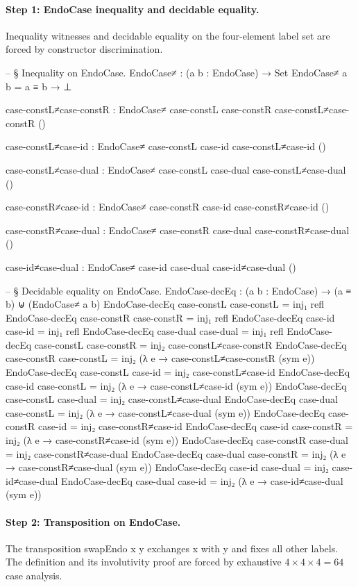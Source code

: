 \documentclass[11pt,a4paper]{book}
\def\texttt#1{#1}%
\begin{document}
\paragraph{Step 1: EndoCase inequality and decidable equality.}
Inequality witnesses and decidable equality on the four-element label set are forced by constructor discrimination.

\begin{code}
-- § Inequality on EndoCase.
EndoCase≠ : (a b : EndoCase) → Set
EndoCase≠ a b = a ≡ b → ⊥

case-constL≠case-constR : EndoCase≠ case-constL case-constR
case-constL≠case-constR ()

case-constL≠case-id : EndoCase≠ case-constL case-id
case-constL≠case-id ()

case-constL≠case-dual : EndoCase≠ case-constL case-dual
case-constL≠case-dual ()

case-constR≠case-id : EndoCase≠ case-constR case-id
case-constR≠case-id ()

case-constR≠case-dual : EndoCase≠ case-constR case-dual
case-constR≠case-dual ()

case-id≠case-dual : EndoCase≠ case-id case-dual
case-id≠case-dual ()

-- § Decidable equality on EndoCase.
EndoCase-decEq : (a b : EndoCase) → (a ≡ b) ⊎ (EndoCase≠ a b)
EndoCase-decEq case-constL case-constL = inj₁ refl
EndoCase-decEq case-constR case-constR = inj₁ refl
EndoCase-decEq case-id     case-id     = inj₁ refl
EndoCase-decEq case-dual   case-dual   = inj₁ refl
EndoCase-decEq case-constL case-constR = inj₂ case-constL≠case-constR
EndoCase-decEq case-constR case-constL = inj₂ (λ e → case-constL≠case-constR (sym e))
EndoCase-decEq case-constL case-id     = inj₂ case-constL≠case-id
EndoCase-decEq case-id     case-constL = inj₂ (λ e → case-constL≠case-id (sym e))
EndoCase-decEq case-constL case-dual   = inj₂ case-constL≠case-dual
EndoCase-decEq case-dual   case-constL = inj₂ (λ e → case-constL≠case-dual (sym e))
EndoCase-decEq case-constR case-id     = inj₂ case-constR≠case-id
EndoCase-decEq case-id     case-constR = inj₂ (λ e → case-constR≠case-id (sym e))
EndoCase-decEq case-constR case-dual   = inj₂ case-constR≠case-dual
EndoCase-decEq case-dual   case-constR = inj₂ (λ e → case-constR≠case-dual (sym e))
EndoCase-decEq case-id     case-dual   = inj₂ case-id≠case-dual
EndoCase-decEq case-dual   case-id     = inj₂ (λ e → case-id≠case-dual (sym e))
\end{code}

\paragraph{Step 2: Transposition on EndoCase.}
The transposition \texttt{swapEndo x y} exchanges \texttt{x} with \texttt{y} and fixes all other labels.
The definition and its involutivity proof are forced by exhaustive $4 \times 4 \times 4 = 64$ case analysis.
\end{document}
